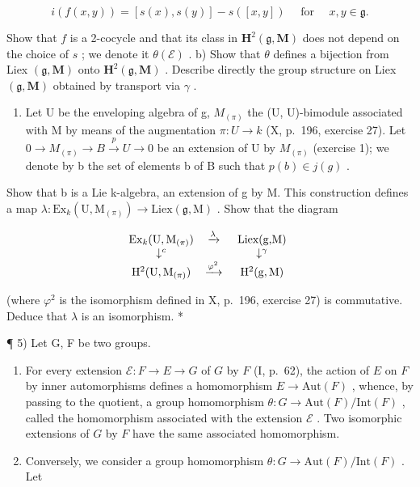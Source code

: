 \[
i (f (x, y)) = [ s (x), s (y) ] - s ([ x , y ]) \quad \text { for } \quad x  ,   y \in \mathfrak {g}  .
\]

Show that \(f\) is a 2-cocycle and that its class in \(\mathbf{H}^{2}(\mathfrak{g},\mathbf{M})\) does not depend on the choice of \(s\) ; we denote it \(\theta(\mathcal{E})\) . b) Show that \(\theta\) defines a bijection from Liex \((\mathfrak{g},\mathbf{M})\) onto \(\mathbf{H}^{2}(\mathfrak{g},\mathbf{M})\) . Describe directly the group structure on Liex \((\mathfrak{g},\mathbf{M})\) obtained by transport via \(\gamma\) .

\begin{enumerate}
\def\labelenumi{\alph{enumi})}
\setcounter{enumi}{2}
\tightlist
\item
  Let U be the enveloping algebra of g, \(M_{(\pi)}\) the (U, U)-bimodule associated with M by means of the augmentation \(\pi: U \to k\) (X, p.~196, exercise 27). Let \(0 \to M_{(\pi)} \to B \xrightarrow{p} U \to 0\) be an extension of U by \(M_{(\pi)}\) (exercise 1); we denote by b the set of elements b of B such that \(p(b) \in j(g)\) .
\end{enumerate}

Show that b is a Lie k-algebra, an extension of g by M. This construction defines a map \(\lambda: \mathrm{Ex}_{k}(\mathrm{U}, \mathrm{M}_{(\pi)}) \to \mathrm{Liex}(\mathfrak{g}, \mathrm{M})\) . Show that the diagram

\[
\begin{array}{c c c} \operatorname{Ex} _ {k} (\mathrm{U}, \mathrm{M} _ {(\pi)}) & \xrightarrow {\lambda} & \text { Liex(g,M) } \\ \downarrow^ {c} & & \downarrow^ {\gamma} \\ \mathrm{H} ^ {2} (\mathrm{U}, \mathrm{M} _ {(\pi)}) & \xrightarrow {\varphi^ {2}} & \mathrm{H} ^ {2} (\mathrm{g,M}) \end{array}
\]

(where \(\varphi^2\) is the isomorphism defined in X, p.~196, exercise 27) is commutative. Deduce that \(\lambda\) is an isomorphism. *

¶ 5) Let G, F be two groups.

\begin{enumerate}
\def\labelenumi{\alph{enumi})}
\item
  For every extension \(\mathcal{E}: F \to E \to G\) of \(G\) by \(F\) (I, p.~62), the action of \(E\) on \(F\) by inner automorphisms defines a homomorphism \(E \to \text{Aut}(F)\) , whence, by passing to the quotient, a group homomorphism \(\theta: G \to \text{Aut}(F)/\text{Int}(F)\) , called the homomorphism associated with the extension \(\mathcal{E}\) . Two isomorphic extensions of \(G\) by \(F\) have the same associated homomorphism.
\item
  Conversely, we consider a group homomorphism \(\theta: G \to \text{Aut} (F)/\text{Int} (F)\) . Let
\end{enumerate}

